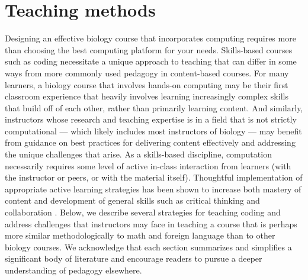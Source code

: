 \section{Teaching methods}


Designing an effective biology course that incorporates computing requires more than choosing the best computing platform for your needs. Skills-based courses such as coding necessitate a unique approach to teaching that can differ in some ways from more commonly used pedagogy in content-based courses. 
For many learners, a biology course that involves hands-on computing may be their first classroom experience that heavily involves learning increasingly complex skills that build off of each other, rather than primarily learning content. And similarly, instructors whose research and teaching expertise is in a field that is not strictly computational --- which likely includes most instructors of biology --- may benefit from guidance on best practices for delivering content effectively and addressing the unique challenges that arise. As a skills-based discipline, computation 
necessarily requires some level of active in-class interaction from learners (with the instructor or peers, or with the material itself). Thoughtful implementation of appropriate active learning strategies has been shown to increase both mastery of content and development of general skills such as critical thinking and collaboration \citep{faust_paulson_1998}. Below, we describe several strategies for teaching coding and address challenges that instructors may face in teaching a course that is perhaps more similar methodologically to math and foreign language than to other biology courses.
We acknowledge that each section summarizes and simplifies a significant body of literature
and encourage readers to pursue a deeper understanding of pedagogy elsewhere.

